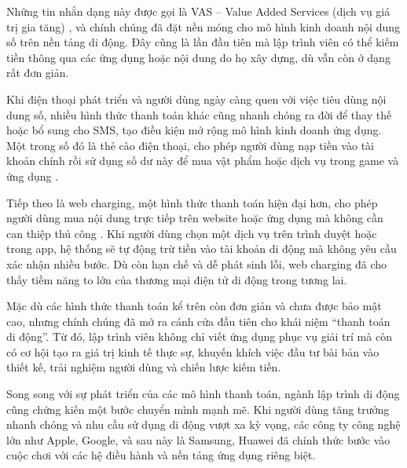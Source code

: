 \vspace{0.5em}

\hspace*{0.8cm}Những tin nhắn dạng này được gọi là VAS – Value Added Services (dịch vụ giá trị gia tăng) \cite{vas-overview}, và chính chúng đã đặt nền móng cho mô hình kinh doanh nội dung số trên nền tảng di động. Đây cũng là lần đầu tiên mà lập trình viên có thể kiếm tiền thông qua các ứng dụng hoặc nội dung do họ xây dựng, dù vẫn còn ở dạng rất đơn giản.

\vspace{0.5em}

\hspace*{0.8cm}Khi điện thoại phát triển và người dùng ngày càng quen với việc tiêu dùng nội dung số, nhiều hình thức thanh toán khác cũng nhanh chóng ra đời để thay thế hoặc bổ sung cho SMS, tạo điều kiện mở rộng mô hình kinh doanh ứng dụng. Một trong số đó là thẻ cào điện thoại, cho phép người dùng nạp tiền vào tài khoản chính rồi sử dụng số dư này để mua vật phẩm hoặc dịch vụ trong game và ứng dụng \cite{prepaid-topup}.

\vspace{0.5em}

\hspace*{0.8cm}Tiếp theo là web charging, một hình thức thanh toán hiện đại hơn, cho phép người dùng mua nội dung trực tiếp trên website hoặc ứng dụng mà không cần can thiệp thủ công \cite{web-charging}. Khi người dùng chọn một dịch vụ trên trình duyệt hoặc trong app, hệ thống sẽ tự động trừ tiền vào tài khoản di động mà không yêu cầu xác nhận nhiều bước. Dù còn hạn chế và dễ phát sinh lỗi, web charging đã cho thấy tiềm năng to lớn của thương mại điện tử di động trong tương lai.

\vspace{0.5em}

\hspace*{0.8cm}Mặc dù các hình thức thanh toán kể trên còn đơn giản và chưa được bảo mật cao, nhưng chính chúng đã mở ra cánh cửa đầu tiên cho khái niệm “thanh toán di động”. Từ đó, lập trình viên không chỉ viết ứng dụng phục vụ giải trí mà còn có cơ hội tạo ra giá trị kinh tế thực sự, khuyến khích việc đầu tư bài bản vào thiết kế, trải nghiệm người dùng và chiến lược kiếm tiền.

\vspace{0.5em}

\hspace*{0.8cm}Song song với sự phát triển của các mô hình thanh toán, ngành lập trình di động cũng chứng kiến một bước chuyển mình mạnh mẽ. Khi người dùng tăng trưởng nhanh chóng và nhu cầu sử dụng di động vượt xa kỳ vọng, các công ty công nghệ lớn như Apple, Google, và sau này là Samsung, Huawei đã chính thức bước vào cuộc chơi với các hệ điều hành và nền tảng ứng dụng riêng biệt.

